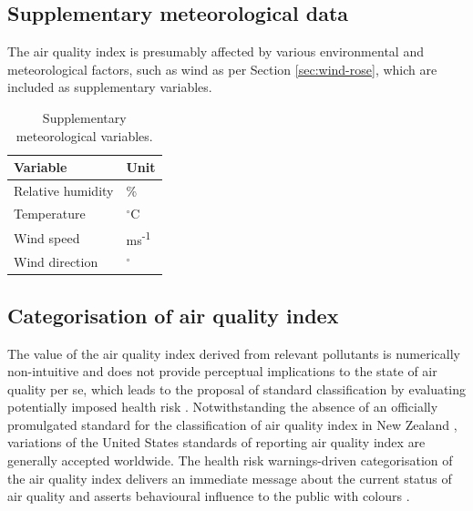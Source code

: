\documentclass{aucklandthesis}
\begin{document}
\hypertarget{supplementary-meteorological-data}{%
\subsection{Supplementary meteorological data}\label{supplementary-meteorological-data}}

The air quality index is presumably affected by various environmental and meteorological factors, such as wind as per Section \ref{sec:wind-rose}, which are included as supplementary variables.

\begin{table}[ht]
\begin{center}
\begin{tabular}{ll}
\toprule
Variable & Unit \\
\midrule
Relative humidity & \% \\
Temperature & $^{\circ}$C \\
Wind speed & ms\textsuperscript{-1} \\
Wind direction & $^{\circ}$ \\
\bottomrule
\end{tabular}
\caption{Supplementary meteorological variables.}
\label{tab:met-dataset}
\end{center}
\end{table}

\hypertarget{categorisation-of-air-quality-index}{%
\subsection{Categorisation of air quality index}\label{categorisation-of-air-quality-index}}

The value of the air quality index derived from relevant pollutants is numerically non-intuitive and does not provide perceptual implications to the state of air quality per se, which leads to the proposal of standard classification by evaluating potentially imposed health risk \autocite{aqidef}. Notwithstanding the absence of an officially promulgated standard for the classification of air quality index in New Zealand \autocite{nzaqrg}, variations of the United States standards of reporting air quality index \autocite{usaqrs} are generally accepted worldwide. The health risk warnings-driven categorisation of the air quality index delivers an immediate message about the current status of air quality and asserts behavioural influence to the public with colours \autocite{colwarn}.
\end{document}

